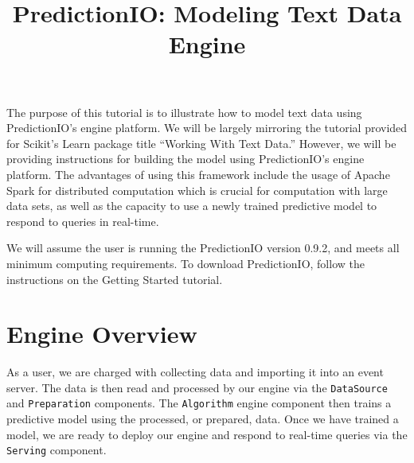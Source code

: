 \documentclass[a4paper,12pt]{article}
\renewcommand{\bf}[1]{\textbf{#1}}
\renewcommand{\tt}[1]{\texttt{#1}}
\newcommand{\3}{\left}
\newcommand{\4}{\right}
\renewcommand{\-}[1]{{}^{-#1}}
\begin{document}
\title{\vspace{-1.5 cm}\bf{PredictionIO: Modeling Text Data Engine}}
\author{\vspace{-2cm}}
\date{}
\maketitle


The purpose of this tutorial is to illustrate how to model text data using PredictionIO's engine platform. We will be largely mirroring the tutorial provided for Scikit's Learn package title \enquote{Working With Text Data.} However, we will be providing instructions for building the model using PredictionIO's engine platform. The advantages of using this framework include the usage of Apache Spark for distributed computation which is crucial for computation with large data sets, as well as the capacity to use a newly trained predictive model to respond to queries in real-time. 

We will assume the user is running the PredictionIO version 0.9.2, and meets all minimum computing requirements. To download PredictionIO, follow the instructions on the Getting Started tutorial.

\section*{Engine Overview}

As a user, we are charged with collecting data and importing it into an event server. The data is then read and processed by our engine via the \tt{DataSource} and \tt{Preparation} components. The \tt{Algorithm} engine component then trains a predictive model using the processed, or prepared, data. Once we have trained a model, we are ready to deploy our engine and respond to real-time queries via the \tt{Serving} component. 

\end{document}
